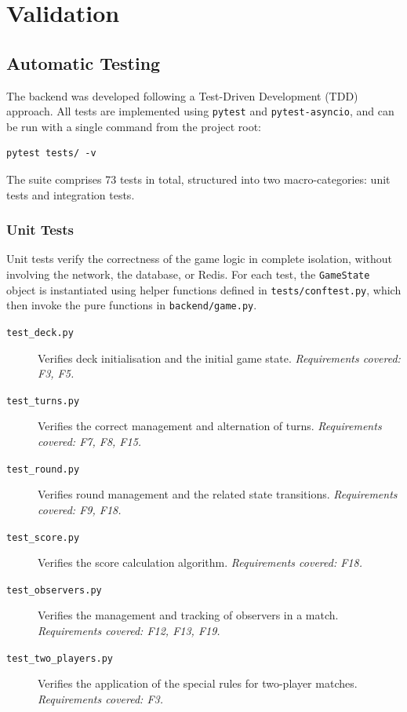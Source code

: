 \documentclass{scrartcl}
\begin{document}
\section{Validation}\label{validation}

\subsection{Automatic Testing}\label{automatic-testing}

The backend was developed following a Test-Driven Development (TDD) approach.
All tests are implemented using \texttt{pytest} and \texttt{pytest-asyncio},
and can be run with a single command from the project root:

\begin{verbatim}
pytest tests/ -v
\end{verbatim}

The suite comprises 73 tests in total, structured into two macro-categories:
unit tests and integration tests.

\subsubsection*{Unit Tests}

Unit tests verify the correctness of the game logic in complete isolation,
without involving the network, the database, or Redis.
For each test, the \texttt{GameState} object is instantiated using helper
functions defined in \texttt{tests/conftest.py}, which then invoke the pure
functions in \texttt{backend/game.py}.

\begin{description}
  \item[\texttt{test\_deck.py}] Verifies deck initialisation and the initial
  game state. \textit{Requirements covered: F3, F5.}

  \item[\texttt{test\_turns.py}] Verifies the correct management and
  alternation of turns. \textit{Requirements covered: F7, F8, F15.}

  \item[\texttt{test\_round.py}] Verifies round management and the related
  state transitions. \textit{Requirements covered: F9, F18.}

  \item[\texttt{test\_score.py}] Verifies the score calculation algorithm.
  \textit{Requirements covered: F18.}

  \item[\texttt{test\_observers.py}] Verifies the management and tracking
  of observers in a match. \textit{Requirements covered: F12, F13, F19.}

  \item[\texttt{test\_two\_players.py}] Verifies the application of the
  special rules for two-player matches. \textit{Requirements covered: F3.}
\end{description}
\end{document}
